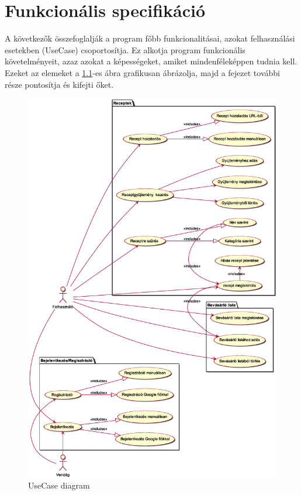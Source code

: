 \documentclass[12pt]{report}
\theoremstyle{definition}
\begin{document}

\chapter{Funkcionális specifikáció}
A következők összefoglalják a program főbb funkcionalitásai, azokat felhasználási esetekben (UseCase) csoportosítja. Ez alkotja  program funkcionális követelményeit, azaz azokat a képességeket, amiket mindenféleképpen tudnia kell. Ezeket az elemeket a \ref{fig:useCase}-es ábra grafikusan ábrázolja, majd a fejezet további része pontosítja és kifejti őket.

\noindent
\begin{figure}[h]
	\centering
	\includegraphics[width=\textwidth]{out/diagrams/useCase/use-case.eps}
	\caption{UseCase diagram}
    \label{fig:useCase}
\end{figure}
\end{document}
